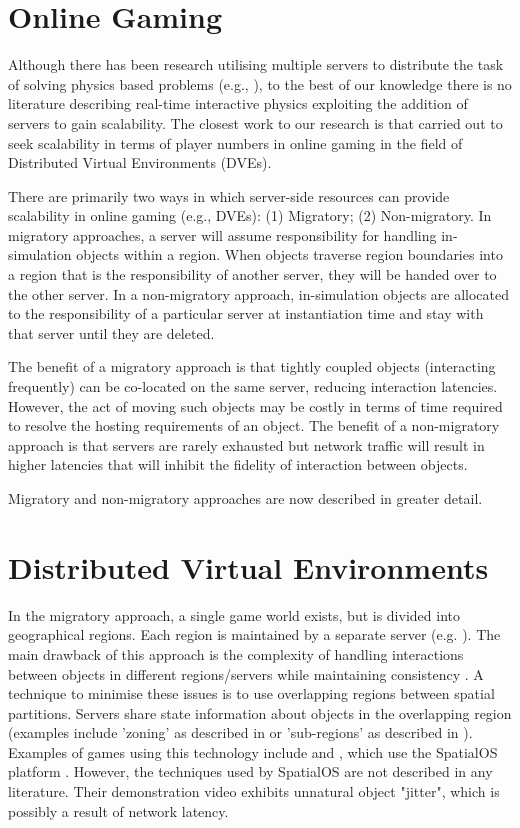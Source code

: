 \section{Online Gaming}
Although there has been research utilising multiple servers to distribute the task of solving physics based problems (e.g., \cite{mashayekhi2018automatically}), to the best of our knowledge there is no literature describing real-time interactive physics exploiting the addition of servers to gain scalability. The closest work to our research is that carried out to seek scalability in terms of player numbers in online gaming in the field of Distributed Virtual Environments (DVEs). 

There are primarily two ways in which server-side resources can provide scalability in online gaming (e.g., DVEs): (1) Migratory; (2) Non-migratory. In migratory approaches, a server will assume responsibility for handling in-simulation objects within a region. When objects traverse region boundaries into a region that is the responsibility of another server, they will be handed over to the other server. In a non-migratory approach, in-simulation objects are allocated to the responsibility of a particular server at instantiation time and stay with that server until they are deleted.

The benefit of a migratory approach is that tightly coupled objects (interacting frequently) can be co-located on the same server, reducing interaction latencies. However, the act of moving such objects may be costly in terms of time required to resolve the hosting requirements of an object. The benefit of a non-migratory approach is that servers are rarely exhausted but network traffic will result in higher latencies that will inhibit the fidelity of interaction between objects.

Migratory and non-migratory approaches are now described in greater detail.

\section{Distributed Virtual Environments}
 In the migratory approach, a single game world exists, but is divided into geographical regions. Each region is maintained by a separate server (e.g. \cite{AnOverlappingArchitecture, ScalabilityIssues, LoadBalancingForDistributedVR, ALoadBalancingAlgorithm, SpatialOS}). The main drawback of this approach is the complexity of handling interactions between objects in different regions/servers while maintaining consistency \cite{P2PForMMOs}. A technique to minimise these issues is to use overlapping regions between spatial partitions. Servers share state information about objects in the overlapping region (examples include 'zoning' as described in \cite{AnOverlappingArchitecture} or 'sub-regions' as described in \cite{ScalabilityIssues}). Examples of games using this technology include \cite{Vanishin30:online} and \cite{WorldsAd48:online}, which use the SpatialOS platform \cite{SpatialOS}. However, the techniques used by SpatialOS are not described in any literature. Their demonstration video exhibits unnatural object "jitter", which is possibly a result of network latency. 
 
